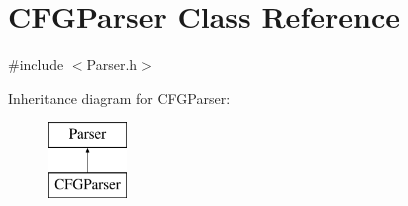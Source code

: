 \hypertarget{classCFGParser}{\section{C\-F\-G\-Parser Class Reference}
\label{classCFGParser}
}


{\ttfamily \#include $<$Parser.\-h$>$}

Inheritance diagram for C\-F\-G\-Parser\-:\begin{figure}[H]
\begin{center}
\leavevmode
\includegraphics[height=2.000000cm]{da/d24/classCFGParser}
\end{center}
\end{figure}
